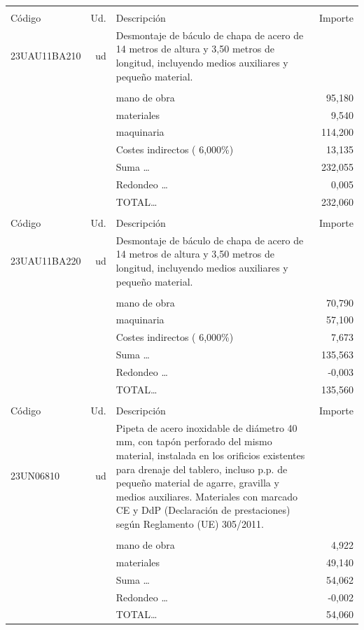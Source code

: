 \begin{supertabular}{l r p{60mm} r}
&&&\\%
Código&Ud.&Descripción&Importe\\%
\hline%
23UAU11BA210&ud&Desmontaje de báculo de chapa de acero de 14 metros de altura y 3,50 metros de longitud, incluyendo medios auxiliares y pequeño material.&\\%
&&&\\%
&&mano de obra&    95,180\\%
&&materiales&     9,540\\%
&&maquinaria&   114,200\\%
&&Costes indirectos (     6,000\%)&    13,135\\%
&&Suma \ldots&   232,055\\%
&&Redondeo \ldots&     0,005\\%
%
&&TOTAL\ldots&   232,060\\%
&&&\\%
Código&Ud.&Descripción&Importe\\%
\hline%
23UAU11BA220&ud&Desmontaje de báculo de chapa de acero de 14 metros de altura y 3,50 metros de longitud, incluyendo medios auxiliares y pequeño material.&\\%
&&&\\%
&&mano de obra&    70,790\\%
&&maquinaria&    57,100\\%
&&Costes indirectos (     6,000\%)&     7,673\\%
&&Suma \ldots&   135,563\\%
&&Redondeo \ldots&    {-}0,003\\%
%
&&TOTAL\ldots&   135,560\\%
&&&\\%
Código&Ud.&Descripción&Importe\\%
\hline%
23UN06810&ud&Pipeta de acero inoxidable de diámetro 40 mm, con tapón perforado del mismo material, instalada en los orificios existentes para drenaje del tablero, incluso p.p. de pequeño material de agarre, gravilla y medios auxiliares. Materiales con marcado CE y DdP (Declaración de prestaciones) según Reglamento (UE) 305/2011.&\\%
&&&\\%
&&mano de obra&     4,922\\%
&&materiales&    49,140\\%
&&Suma \ldots&    54,062\\%
&&Redondeo \ldots&    {-}0,002\\%
%
&&TOTAL\ldots&    54,060\\%

\end{supertabular}
